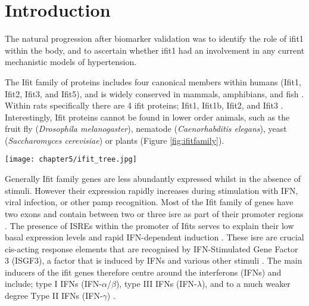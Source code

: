 \doublespacing

\section{Introduction}

The natural progression after biomarker validation was to identify the role of \acrfull{ifit1} within the body, and to ascertain whether \acrshort{ifit1} had an involvement in any current mechanistic models of hypertension.

The Ifit family of proteins includes four canonical members within humans (Ifit1, Ifit2, Ifit3, and Ifit5), and is widely conserved in mammals, amphibians, and fish \cite{Pichlmair2011,Diamond2013}. Within rats specifically there are 4 ifit proteins; Ifit1, Ifit1b, Ifit2, and Ifit3 \cite{Zhou2013}. Interestingly, Ifit proteins cannot be found in lower order animals, such as the fruit fly (\textit{Drosophila melanogaster}), nematode (\textit{Caenorhabditis elegans}), yeast (\textit{Saccharomyces cerevisiae}) or plants \cite{Chebath1983,Kusari1987} (Figure \ref{fig:ifitfamily}). 

\begin{figure*}[!htbp]
\centering
\texttt{[image: chapter5/ifit\_tree.jpg]}
\caption[Phylogeny of Ifit family proteins]{Phylogeny of Ifit family proteins, as taken from Zhou \textit{et al} 2013, and generated by MEGA4.0 \cite{Zhou2013,Tamura2007}}
\label{fig:ifitfamily}
\end{figure*}

Generally Ifit family genes are less abundantly expressed whilst in the absence of stimuli. However their expression rapidly increases during stimulation with IFN, viral infection, or other \acrfull{pamp} recognition. Most of the Ifit family of genes have two exons and contain between two or three \acrfull{isre} as part of their promoter regions \cite{Fensterl2011}. The presence of ISREs within the promoter of Ifits serves to explain their low basal expression levels and rapid IFN-dependent induction \cite{Sarkar2004}. These \acrshort{isre} are crucial cis-acting response elements that are recognised by IFN-Stimulated Gene Factor 3 (ISGF3), a factor that is induced by IFNs and various other stimuli \cite{Gobin1997}. The main inducers of the ifit genes therefore centre around the interferons (IFNs) and include; type I IFNs (IFN-$\alpha$/$\beta$), type III IFNs (IFN-$\lambda$), and to a much weaker degree Type II IFNs (IFN-$\gamma$) \cite{Der1998,Kohli2012}. 

